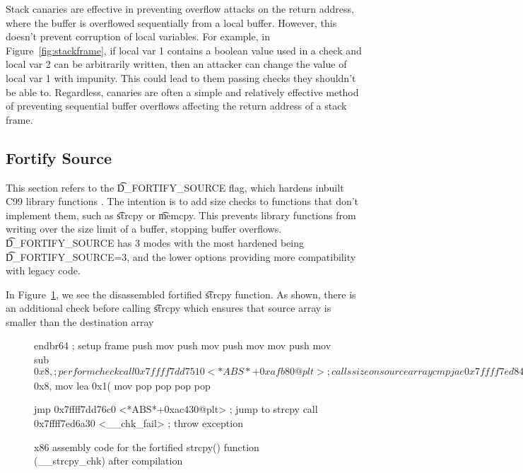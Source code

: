 Stack canaries are effective in preventing overflow attacks on the return address, where the buffer is overflowed sequentially from a local buffer. 
However, this doesn't prevent corruption of local variables. 
For example, in Figure~\ref{fig:stackframe}, if local var 1 contains a boolean value used in a check and local var 2 can be arbitrarily written, then an attacker can change the value of local var 1 with impunity. 
This could lead to them passing checks they shouldn't be able to. 
Regardless, canaries are often a simple and relatively effective method of preventing sequential buffer overflows affecting the return address of a stack frame. 

\subsection{Fortify Source}

This section refers to the \t{D\_FORTIFY\_SOURCE} flag, which hardens inbuilt C99 library functions \citep{}. 
The intention is to add size checks to functions that don't implement them, such as \t{strcpy} or \t{memcpy}. 
This prevents library functions from writing over the size limit of a buffer, stopping buffer overflows. 
\t{D\_FORTIFY\_SOURCE} has 3 modes with the most hardened being \t{D\_FORTIFY\_SOURCE=3}, and the lower options providing more compatibility with legacy code. 

In Figure~\ref{fig:fortifyasm}, we see the disassembled fortified \t{strcpy} function. 
As shown, there is an additional check before calling \t{strcpy} which ensures that source array is smaller than the destination array

\begin{figure}[H]
    \begin{gaslst}
        endbr64
        ; setup frame
        push   %
        mov    %
        push   %
        mov    %
        push   %
        mov    %
        mov    %
        push   %
        mov    %
        sub    $0x8,%

        ; perform check
        call   0x7ffff7dd7510 <*ABS*+0xafb80@plt> ; calls size on source array
        cmp    %
        jae    0x7ffff7ed8470 <__strcpy_chk+64> ; jump to last line if source size is greater or equal to destination size

        ; remove stack frame
        add    $0x8,%
        mov    %
        lea    0x1(%
        mov    %
        pop    %
        pop    %
        pop    %
        pop    %
        
        jmp    0x7ffff7dd76c0 <*ABS*+0xac430@plt>   ; jump to strcpy 
        call   0x7ffff7ed6a30 <__chk_fail>  ; throw exception
\end{gaslst}

\caption{x86 assembly code for the fortified strcpy() function (\_\_strcpy\_chk) after compilation}
\label{fig:fortifyasm}
\end{figure}


